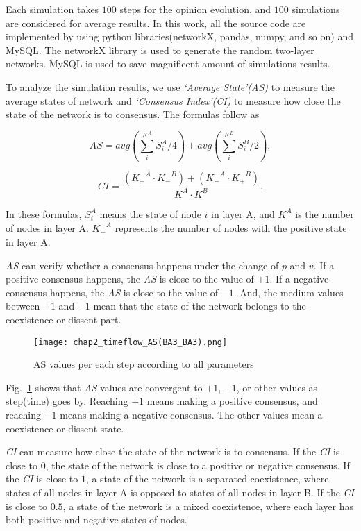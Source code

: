 Each simulation takes $100$ steps for the opinion evolution, and $100$ simulations are considered for average results. In this work, all the source code are implemented by using python libraries(networkX, pandas, numpy, and so on) and MySQL. The networkX library is used to generate the random two-layer networks. MySQL is used to save magnificent amount of simulations results. 

To analyze the simulation results, we use \textit{`Average State'(AS)} to measure the average states of network and \textit{`Consensus Index'(CI)} to measure how close the state of the network is to consensus. The formulas follow as

\begin{equation}
AS = avg\left( {\sum\limits_i^{{K^A}} {S_i^A/4} } \right) + avg\left( {\sum\limits_i^{{K^B}} {S_i^B/2} } \right),
\end{equation}

\begin{equation}
CI = \frac{{({K_ + }^A \cdot {K_ - }^B) + ({K_ - }^A \cdot {K_ + }^B)}}{{{K^A} \cdot {K^B}}}.
\end{equation}

In these formulas, $S_i^A$ means the state of node $i$ in layer A, and $K^A$ is the number of nodes in layer A. ${K_ + }^A$ represents the number of nodes with the positive state in layer A.   

\textit{AS} can verify whether a consensus happens under the change of $p$ and $v$.  If a positive consensus happens, the \textit{AS} is close to the value of $+1$. If a negative consensus happens, the \textit{AS} is close to the value of $-1$. And, the medium values between $+1$ and $-1$ mean that the state of the network belongs to the coexistence or dissent part.  

\begin{figure}[!htb]
	\centering
	\texttt{[image: chap2\_timeflow\_AS(BA3\_BA3).png]}
	\caption{AS values per each step according to all parameters}
	\label{chap2_timeflow_AS(BA3_BA3)}
\end{figure}

Fig.~\ref{chap2_timeflow_AS(BA3_BA3)} shows that \textit{AS} values are convergent to $+1$, $-1$, or other values as step(time) goes by. Reaching $+1$ means making a positive consensus, and reaching $-1$ means making a negative consensus. The other values mean a coexistence or dissent state. 

\textit{CI} can measure how close the state of the network is to consensus. If the \textit{CI} is close to $0$, the state of the network is close to a positive or negative consensus. If the \textit{CI} is close to $1$, a state of the network is a separated coexistence, where states of all nodes in layer A is opposed to states of all nodes in layer B. If the \textit{CI} is close to $0.5$, a state of the network is a mixed coexistence, where each layer has both positive and negative states of nodes.

